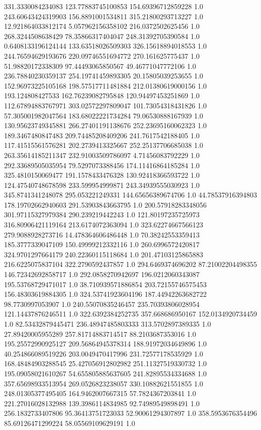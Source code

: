 331.3330084234083	123.77883745100853	154.69396712859228	1.0
243.60643424319903	156.8891001534811	315.21800293713227	1.0
12.921864033812174	5.057962156358102	216.0372502625456	1.0
268.3244508638429	78.35866317404047	248.31392705390584	1.0
0.6408133196124144	133.63518026509303	326.15618894018553	1.0
244.76594629193676	220.09746551694772	270.161625775437	1.0
51.98820172338309	97.44493065850567	49.46771047772106	1.0
236.78840230359137	254.19741459893305	20.15805039253655	1.0
152.96973225105168	198.57517711481884	212.01380619000156	1.0
193.124808427533	162.76239082795848	120.94497453251869	1.0
112.67894883767971	303.02572297809047	101.73054318431826	1.0
57.305001982047564	183.68022221734284	79.06530888167939	1.0
130.95623749345881	266.27401191138676	252.23695160062323	1.0
189.3467480847483	209.74485208409206	241.7617542188405	1.0
117.41515561576281	202.2739413325667	252.25137706685038	1.0
263.35614185211347	232.91003509786097	4.71456083792229	1.0
292.33689505035954	79.5297073388456	174.11416864185284	1.0
325.4810150069477	191.1578433476328	130.92418366593722	1.0
124.47540748678598	233.599954999871	243.34939555030923	1.0
345.8741341248078	295.053221249331	144.65656389674706	1.0
44.78537916394803	178.19702662940603	291.53903843663795	1.0
200.57918283348056	301.97115327979384	290.239219442243	1.0
121.80197235725973	316.80906421119164	213.6174072363094	1.0
323.62274667566123	279.9088928273716	14.478364606486448	1.0
70.38242553359413	185.3777339047109	150.49999212332116	1.0
260.6996572420817	324.9701297664179	240.22360115118684	1.0
201.47103125865883	216.6225075837104	322.2790592437857	1.0
294.6469374696202	87.21002204498355	146.72342692858717	1.0
292.0858270942697	196.0212060343087	195.53768729471017	1.0
38.710939571886854	203.72155746575453	156.48303619884305	1.0
324.53741923604196	187.44942263682722	98.7730997053907	1.0
240.55070835246457	235.70393806028954	121.14437876246511	1.0
322.6392384252735	357.668686950167	152.0134920734459	1.0
82.53432879445471	236.48947485803333	313.5702897389335	1.0
27.89420005955289	257.81714883714517	88.2103687353016	1.0
195.25572990925127	209.56864945378314	188.91972034649896	1.0
40.254866089519226	203.0049470417996	231.72577178535929	1.0
168.48484903288545	25.427056912802982	251.11327519330732	1.0
195.09058021610267	54.655805885637605	241.82895534334688	1.0
357.65698933513954	269.0526823238057	330.10882621551855	1.0
248.01305377495405	164.9462007667315	57.7824367203841	1.0
221.27016028132988	139.3986114834985	92.74989549898491	1.0
256.1832733407806	95.36413751723033	52.90061294307897	1.0
358.5953676354496	85.69126471299224	58.05569109629191	1.0
